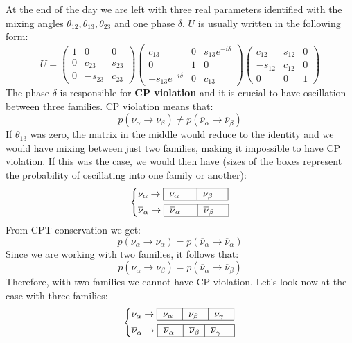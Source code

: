 \documentclass[10.75pt,a4paper,openright,bottom=2cm]{article}
\begin{document}
At the end of the day we are left with three real parameters identified with the mixing angles $\theta_{12}, \theta_{13}, \theta_{23}$ and one phase $\delta$. $U$ is usually written in the following form:
\[
U=\begin{pmatrix}
    1 & 0 & 0\\
    0 & c_{23} & s_{23}\\
    0 & -s_{23} & c_{23}
\end{pmatrix}
\begin{pmatrix}
    c_{13} & 0 & s_{13}e^{-i\delta}\\
    0 & 1 & 0\\
    -s_{13}e^{+i\delta} & 0 & c_{13}
\end{pmatrix}
\begin{pmatrix}
    c_{12} & s_{12} & 0\\
    -s_{12} & c_{12} & 0\\
    0 & 0 & 1
\end{pmatrix}
\]
The phase $\delta$ is responsible for \textbf{CP violation} and it is crucial to have oscillation between three families. CP violation means that:
\[
p(\nu_\alpha\to\nu_\beta)\neq p(\overline{\nu}_\alpha\to\overline{\nu}_\beta)
\]
If $\theta_{13}$ was zero, the matrix in the middle would reduce to the identity and we would have mixing between just two families, making it impossible to have CP violation. If this was the case, we would then have (sizes of the boxes represent the probability of oscillating into one family or another):
\[
\left\{
\begin{aligned}
&\nu_\alpha\to\begin{tabular}{|p{0.8cm}|p{0.7cm}|}
\hline
    $\nu_\alpha$ & $\nu_\beta$ \\
    \hline
\end{tabular}\\
&\overline{\nu}_\alpha\to\begin{tabular}{|p{0.8cm}|p{0.7cm}|}
\hline
    $\overline{\nu}_\alpha$ & $\overline{\nu}_\beta$ \\
    \hline
\end{tabular}
\end{aligned}
\right.
\]
From CPT conservation we get:
\[
p(\nu_\alpha\to\nu_\alpha)=p(\overline{\nu}_\alpha\to\overline{\nu}_\alpha)
\]
Since we are working with two families, it follows that:
\[
p(\nu_\alpha\to\nu_\beta)=p(\overline{\nu}_\alpha\to\overline{\nu}_\beta)
\]
Therefore, with two families we cannot have CP violation. Let's look now at the case with three families:
\[
\left\{
\begin{aligned}
&\nu_\alpha\to\begin{tabular}{|p{0.5cm}|p{0.5cm}|p{0.5cm}|}
\hline
    $\nu_\alpha$ & $\nu_\beta$ & $\nu_\gamma$\\
    \hline
\end{tabular}\\
&\overline{\nu}_\alpha\to\begin{tabular}{|p{0.5cm}|p{0.35cm}|p{0.65cm}|}
\hline
    $\overline{\nu}_\alpha$ & $\overline{\nu}_\beta$ & $\overline{\nu}_\gamma$ \\
    \hline
\end{tabular}
\end{aligned}
\right.
\]
\end{document}
